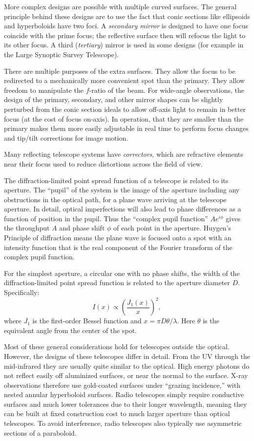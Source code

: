 More complex designs are possible with multiple curved surfaces. The
general principle behind these designs are to use the fact that conic
sections like ellipsoids and hyperboloids have two foci. A {\it
secondary mirror} is designed to have one focus coincide with the
prime focus; the reflective surface then will refocus the light to its
other focus. A third ({\it tertiary}) mirror is used in some designs
(for example in the Large Synoptic Survey Telescope).

There are multiple purposes of the extra surfaces. They allow the
focus to be redirected to a mechanically more convenient spot than the
primary. They allow freedom to manipulate the $f$-ratio of the
beam. For wide-angle observations, the design of the primary,
secondary, and other mirror shapes can be slightly perturbed from the
conic section ideals to allow off-axis light to remain in better focus
(at the cost of focus on-axis). In operation, that they are smaller
than the primary makes them more easily adjustable in real time to
perform focus changes and tip/tilt corrections for image motion.

Many reflecting telescope systems have {\it correctors}, which are
refractive elements near their focus used to reduce distortions across
the field of view.

The diffraction-limited point spread function of a telescope is
related to its aperture. The ``pupil'' of the system is the image of
the aperture including any obstructions in the optical path, for a
plane wave arriving at the telescope aperture. In detail, optical
imperfections will also lead to phase differences as a function of
position in the pupil. Thus the ``complex pupil function'' $A
e^{i\phi}$ gives the throughput $A$ and phase shift $\phi$ of each
point in the aperture. Huygen's Principle of diffraction means the
plane wave is focused onto a spot with an intensity function that is
the real component of the Fourier transform of the complex pupil
function.

For the simplest aperture, a circular one with no phase shifts, the
width of the diffraction-limited point spread function is related to
the aperture diameter $D$. Specifically:
\begin{equation}
I(x) \propto \left(\frac{J_1(x)}{x}\right)^2,
\end{equation}
where $J_1$ is the first-order Bessel function and $x=\pi D \theta
/\lambda$. Here $\theta$ is the equivalent angle from the center of
the spot. 

Most of these general considerations hold for telescopes outside the
optical. However, the designs of these telescopes differ in
detail. From the UV through the mid-infrared they are usually quite
similar to the optical. High energy photons do not reflect easily off
aluminized surfaces, or near the normal to the surface. X-ray
observations therefore use gold-coated surfaces under ``grazing
incidence,'' with nested annular hyperboloid surfaces. Radio
telescopes simply require conductive surfaces and much lower
tolerances due to their longer wavelength, meaning they can be built
at fixed construction cost to much larger aperture than optical
telescopes. To avoid interference, radio telescopes also typically use
asymmetric sections of a paraboloid.

